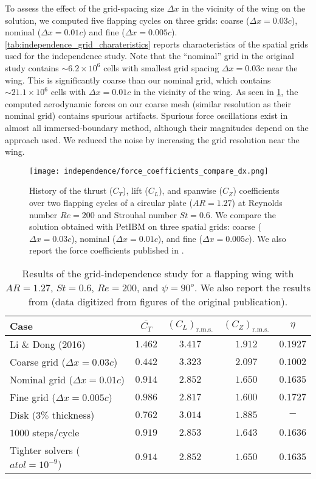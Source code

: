 To assess the effect of the grid-spacing size $\Delta x$ in the vicinity of the wing on the solution, we computed five flapping cycles on three grids: coarse ($\Delta x = 0.03c$), nominal ($\Delta x = 0.01c$) and fine ($\Delta x = 0.005c$).
\cref{tab:independence_grid_charateristics} reports characteristics of the spatial grids used for the independence study.
Note that the ``nominal'' grid in the original study contains $\sim 6.2 \times 10^6$ cells with smallest grid spacing $\Delta x = 0.03c$ near the wing.
This is significantly coarse than our nominal grid, which contains $\sim 21.1 \times 10^6$ cells with $\Delta x = 0.01c$ in the vicinity of the wing.
As seen in \cref{fig:independence_force_coefficients_dx}, the computed aerodynamic forces on our coarse mesh (similar resolution as their nominal grid) contains spurious artifacts.
Spurious force oscillations exist in almost all immersed-boundary method, although their magnitudes depend on the approach used.
We reduced the noise by increasing the grid resolution near the wing.

\begin{figure}[!h]
  \centering
  \texttt{[image: independence/force\_coefficients\_compare\_dx.png]}
  \caption{History of the thrust ($C_T$), lift ($C_L$), and spanwise ($C_Z$) coefficients over two flapping cycles of a circular plate ($AR = 1.27$) at Reynolds number $Re = 200$ and Strouhal number $St = 0.6$. We compare the solution obtained with PetIBM on three spatial grids: coarse ($\Delta x = 0.03c$), nominal ($\Delta x = 0.01c$), and fine ($\Delta x = 0.005c$). We also report the force coefficients published in \citet{li_dong_2016}.}
  \label{fig:independence_force_coefficients_dx}
\end{figure}

\begin{table}[!h]
  \centering
  \begin{tabular}{lcccc}
    \hline\hline
    Case & $\overline{C_T}$ & $\left( C_L \right)_\text{r.m.s.}$ & $\left( C_Z \right)_\text{r.m.s.}$ & $\eta$ \\
    \hline
    Li \& Dong (2016) & $1.462$ & $3.417$ & $1.912$ & $0.1927$ \\
    Coarse grid ($\Delta x = 0.03c$) & $0.442$ & $3.323$ & $2.097$ & $0.1002$ \\
    Nominal grid ($\Delta x = 0.01c$) & $0.914$ & $2.852$ & $1.650$ & $0.1635$ \\
    Fine grid ($\Delta x = 0.005c$) & $0.986$ & $2.817$ & $1.600$ & $0.1727$ \\
    Disk ($3\%$ thickness) & $0.762$ & $3.014$ & $1.885$ & $-$ \\
    $1000$ steps/cycle & $0.919$ & $2.853$ & $1.643$ & $0.1636$ \\
    Tighter solvers ($atol = 10^{-9}$) & $0.914$ & $2.852$ & $1.650$ & $0.1635$ \\
    \hline\hline
  \end{tabular}
  \caption{Results of the grid-independence study for a flapping wing with $AR = 1.27$, $St = 0.6$, $Re = 200$, and $\psi = 90^o$. We also report the results from \citet{li_dong_2016} (data digitized from figures of the original publication).}
  \label{tab:independence_results}
\end{table}

